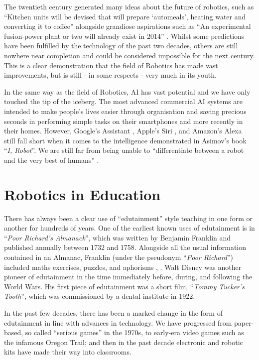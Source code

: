 \documentclass{report}
\newcommand{\tit}[1]{\textit{#1}}
\newcommand{\propernoun}[1]{\enquote{\tit{#1}}}
\begin{document}
    The twentieth century generated many ideas about the future of robotics, such as \enquote{Kitchen units will be devised that will prepare \enquote{automeals}, heating water and converting it to coffee} alongside grandiose aspirations such as \enquote{An experimental fusion-power plant or two will already exist in 2014} \cite{Asimov1964}. Whilst some predictions have been fulfilled by the technology of the past two decades, others are still nowhere near completion and could be considered impossible for the next century. This is a clear demonstration that the field of Robotics has made vast improvements, but is still - in some respects - very much in its youth.
    
    In the same way as the field of Robotics, AI has vast potential and we have only touched the tip of the iceberg. The most advanced commercial AI systems are intended to make people's lives easier through organisation and saving precious seconds in performing simple tasks on their smartphones and more recently in their homes. However, Google's Assistant \cite{Google2016}, Apple's Siri \cite{Apple2011}, and Amazon's Alexa \cite{Amazon2014} still fall short when it comes to the intelligence demonstrated in Asimov's book \propernoun{I, Robot}. We are still far from being unable to \enquote{differentiate between a robot and the very best of humans} \cite{Asimov1970}.
    
    \section{Robotics in Education}
    There has always been a clear use of \enquote{edutainment} style teaching in one form or another for hundreds of years. One of the earliest known uses of edutainment is in \propernoun{Poor Richard's Almanack}, which was written by Benjamin Franklin and published annually between 1732 and 1758. Alongside all the usual information contained in an Almanac, Franklin (under the pseudonym \propernoun{Poor Richard}) included maths exercises, puzzles, and aphorisms \cite{Beato2015}, \cite{Franklin1732}. Walt Disney was another pioneer of edutainment in the time immediately before, during, and following the World Wars. His first piece of edutainment was a short film, \propernoun{Tommy Tucker's Tooth}, which was commissioned by a dental institute in 1922.
    
    In the past few decades, there has been a marked change in the form of edutainment in line with advances in technology. We have progressed from paper-based, so called \enquote{serious games} in the 1970s, to early-era video games such as the infamous Oregon Trail; and then in the past decade electronic and robotic kits have made their way into classrooms.
    
\end{document}
